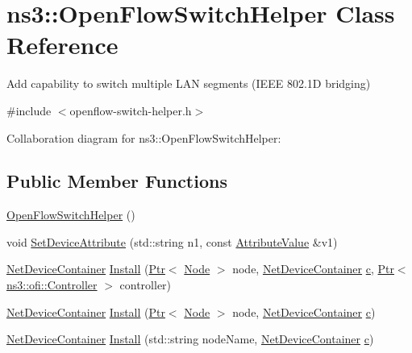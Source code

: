 \hypertarget{classns3_1_1OpenFlowSwitchHelper}{}\section{ns3\+:\+:Open\+Flow\+Switch\+Helper Class Reference}
\label{classns3_1_1OpenFlowSwitchHelper}


Add capability to switch multiple L\+AN segments (I\+E\+EE 802.\+1D bridging)  




{\ttfamily \#include $<$openflow-\/switch-\/helper.\+h$>$}



Collaboration diagram for ns3\+:\+:Open\+Flow\+Switch\+Helper\+:
\subsection*{Public Member Functions}
\begin{DoxyCompactItemize}
\item 
\hyperlink{classns3_1_1OpenFlowSwitchHelper_abd17b1fac0816a68f000f6bdf4152597}{Open\+Flow\+Switch\+Helper} ()
\item 
void \hyperlink{classns3_1_1OpenFlowSwitchHelper_afa3abb1ef32614b41bd5e76e35385961}{Set\+Device\+Attribute} (std\+::string n1, const \hyperlink{classns3_1_1AttributeValue}{Attribute\+Value} \&v1)
\item 
\hyperlink{classns3_1_1NetDeviceContainer}{Net\+Device\+Container} \hyperlink{classns3_1_1OpenFlowSwitchHelper_a761e89df7011d691652d85bc5c36e32d}{Install} (\hyperlink{classns3_1_1Ptr}{Ptr}$<$ \hyperlink{classns3_1_1Node}{Node} $>$ node, \hyperlink{classns3_1_1NetDeviceContainer}{Net\+Device\+Container} \hyperlink{mmwave_2model_2fading-traces_2fading__trace__generator_8m_ae0323a9039add2978bf5b49550572c7c}{c}, \hyperlink{classns3_1_1Ptr}{Ptr}$<$ \hyperlink{classns3_1_1ofi_1_1Controller}{ns3\+::ofi\+::\+Controller} $>$ controller)
\item 
\hyperlink{classns3_1_1NetDeviceContainer}{Net\+Device\+Container} \hyperlink{classns3_1_1OpenFlowSwitchHelper_ae900781ccc6eda02db3e79ea4cbe68cc}{Install} (\hyperlink{classns3_1_1Ptr}{Ptr}$<$ \hyperlink{classns3_1_1Node}{Node} $>$ node, \hyperlink{classns3_1_1NetDeviceContainer}{Net\+Device\+Container} \hyperlink{mmwave_2model_2fading-traces_2fading__trace__generator_8m_ae0323a9039add2978bf5b49550572c7c}{c})
\item 
\hyperlink{classns3_1_1NetDeviceContainer}{Net\+Device\+Container} \hyperlink{classns3_1_1OpenFlowSwitchHelper_a8766da0428df9ca068a77752dd331100}{Install} (std\+::string node\+Name, \hyperlink{classns3_1_1NetDeviceContainer}{Net\+Device\+Container} \hyperlink{mmwave_2model_2fading-traces_2fading__trace__generator_8m_ae0323a9039add2978bf5b49550572c7c}{c})
\end{DoxyCompactItemize}
